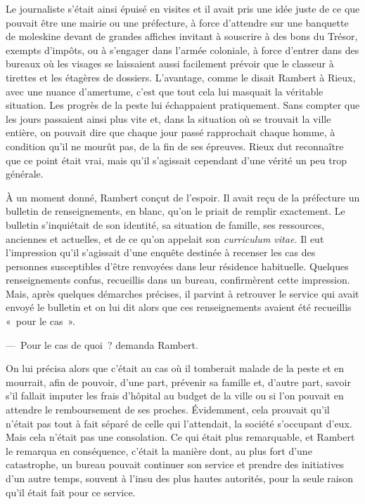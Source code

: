 \documentclass[french,twoside]{book} %
\begin{document}
Le journaliste s’était ainsi épuisé en visites et il avait pris une idée juste de ce que pouvait être une mairie ou une préfecture, à force d’attendre sur une banquette de moleskine devant de grandes affiches invitant à souscrire à des bons du Trésor, exempts d’impôts, ou à s’engager dans l’armée coloniale, à force d’entrer dans des bureaux où les visages se laissaient aussi facilement prévoir que le classeur à tirettes et les étagères de dossiers. L’avantage, comme le disait Rambert à Rieux, avec une nuance d’amertume, c’est que tout cela lui masquait la véritable situation. Les progrès de la peste lui échappaient pratiquement. Sans compter que les jours passaient ainsi plus vite et, dans la situation où se trouvait la ville entière, on pouvait dire que chaque jour passé rapprochait chaque homme, à condition qu’il ne mourût pas, de la fin de ses épreuves. Rieux dut reconnaître que ce point était vrai, mais qu’il s’agissait cependant d’une vérité un peu trop générale.\par
À un moment donné, Rambert conçut de l’espoir. Il avait reçu de la préfecture un bulletin de renseignements, en blanc, qu’on le priait de remplir exactement. Le bulletin s’inquiétait de son identité, sa situation de famille, ses ressources, anciennes et actuelles, et de ce qu’on appelait son \emph{curriculum vitae.} Il eut l’impression qu’il s’agissait d’une enquête destinée à recenser les cas des personnes susceptibles d’être renvoyées dans leur résidence habituelle. Quelques renseignements confus, recueillis dans un bureau, confirmèrent cette impression. Mais, après quelques démarches précises, il parvint à retrouver le service qui avait envoyé le bulletin et on lui dit alors que ces renseignements avaient été recueillis « pour le cas ».\par
— Pour le cas de quoi ? demanda Rambert.\par
On lui précisa alors que c’était au cas où il tomberait malade de la peste et en mourrait, afin de pouvoir, d’une part, prévenir sa famille et, d’autre part, savoir s’il fallait imputer les frais d’hôpital au budget de la ville ou si l’on pouvait en attendre le remboursement de ses proches. Évidemment, cela prouvait qu’il n’était pas tout à fait séparé de celle qui l’attendait, la société s’occupant d’eux. Mais cela n’était pas une consolation. Ce qui était plus remarquable, et Rambert le remarqua en conséquence, c’était la manière dont, au plus fort d’une catastrophe, un bureau pouvait continuer son service et prendre des initiatives d’un autre temps, souvent à l’insu des plus hautes autorités, pour la seule raison qu’il était fait pour ce service.\par
\end{document}
